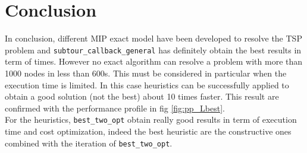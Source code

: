 \chapter{Conclusion}
In conclusion, different MIP exact model have been developed to resolve the TSP problem and \texttt{subtour\_callback\_general} has definitely obtain the best results in term of times. However no exact algorithm can resolve a problem with more than 1000 nodes in less than 600s. This must be considered in particular when the execution time is limited. In this case heuristics can be successfully applied to obtain a good solution (not the best) about 10 times faster. This result are confirmed with the performance profile in fig \ref{fig:pp_Lbest}.\\
For the heuristics, \texttt{best\_two\_opt} obtain really good results in term of execution time and cost optimization, indeed the best heuristic are the constructive ones combined with the iteration of \texttt{best\_two\_opt}.
